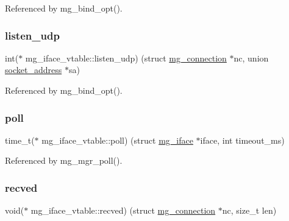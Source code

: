 Referenced by mg\+\_\+bind\+\_\+opt().

\mbox{\label{structmg__iface__vtable_a940fbc2eecb7353136647724d6f4cb39_a940fbc2eecb7353136647724d6f4cb39}} 
\subsubsection{\texorpdfstring{listen\+\_\+udp}{listen\_udp}}
{\footnotesize\ttfamily int($\ast$ mg\+\_\+iface\+\_\+vtable\+::listen\+\_\+udp) (struct \hyperlink{structmg__connection}{mg\+\_\+connection} $\ast$nc, union \hyperlink{unionsocket__address}{socket\+\_\+address} $\ast$sa)}



Referenced by mg\+\_\+bind\+\_\+opt().

\mbox{\label{structmg__iface__vtable_a11baf939815da0f0fc71f27692f907a5_a11baf939815da0f0fc71f27692f907a5}} 
\subsubsection{\texorpdfstring{poll}{poll}}
{\footnotesize\ttfamily time\+\_\+t($\ast$ mg\+\_\+iface\+\_\+vtable\+::poll) (struct \hyperlink{structmg__iface}{mg\+\_\+iface} $\ast$iface, int timeout\+\_\+ms)}



Referenced by mg\+\_\+mgr\+\_\+poll().

\mbox{\label{structmg__iface__vtable_af8c7c999331da0f1d0ac1fda3846b61d_af8c7c999331da0f1d0ac1fda3846b61d}} 
\subsubsection{\texorpdfstring{recved}{recved}}
{\footnotesize\ttfamily void($\ast$ mg\+\_\+iface\+\_\+vtable\+::recved) (struct \hyperlink{structmg__connection}{mg\+\_\+connection} $\ast$nc, size\+\_\+t len)}



